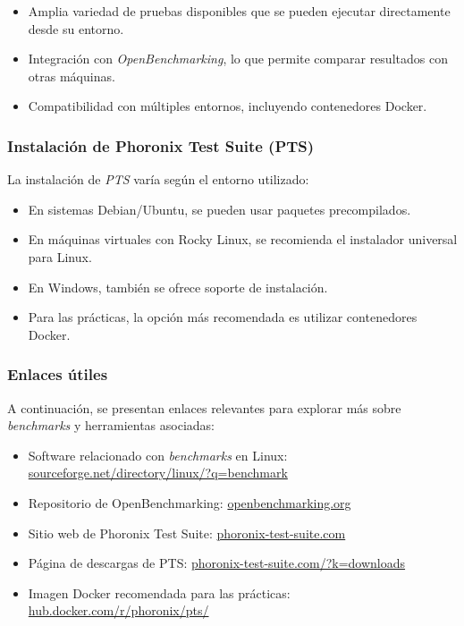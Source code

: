 \begin{itemize}
    \item Amplia variedad de pruebas disponibles que se pueden ejecutar directamente desde su entorno.
    \item Integración con \textit{OpenBenchmarking}, lo que permite comparar resultados con otras máquinas.
    \item Compatibilidad con múltiples entornos, incluyendo contenedores Docker.
\end{itemize}

\subsubsection{Instalación de Phoronix Test Suite (PTS)}

La instalación de \textit{PTS} varía según el entorno utilizado:

\begin{itemize}
    \item En sistemas Debian/Ubuntu, se pueden usar paquetes precompilados.
    \item En máquinas virtuales con Rocky Linux, se recomienda el instalador universal para Linux.
    \item En Windows, también se ofrece soporte de instalación.
    \item Para las prácticas, la opción más recomendada es utilizar contenedores Docker.
\end{itemize}

\subsubsection{Enlaces útiles}

A continuación, se presentan enlaces relevantes para explorar más sobre \textit{benchmarks} y herramientas asociadas:

\begin{itemize}
    \item Software relacionado con \textit{benchmarks} en Linux: \\
    \href{https://sourceforge.net/directory/linux/?q=benchmark}{sourceforge.net/directory/linux/?q=benchmark}
    \item Repositorio de OpenBenchmarking: \href{https://openbenchmarking.org/}{openbenchmarking.org}
    \item Sitio web de Phoronix Test Suite: \href{https://www.phoronix-test-suite.com/}{phoronix-test-suite.com}
    \item Página de descargas de PTS: \href{https://www.phoronix-test-suite.com/?k=downloads}{phoronix-test-suite.com/?k=downloads}
    \item Imagen Docker recomendada para las prácticas: \href{https://hub.docker.com/r/phoronix/pts/}{hub.docker.com/r/phoronix/pts/}
\end{itemize}


